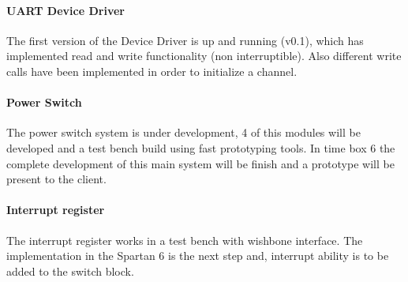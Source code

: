 \paragraph{UART Device Driver}
The first version of the Device Driver is up and running (v0.1), which has implemented read and write functionality (non interruptible). Also different write calls have been implemented in order to initialize a channel.
\paragraph{Power Switch}
The power switch system is under development, 4 of this modules will be developed and a test bench build using fast prototyping tools. In time box 6 the complete development of this main system will be finish and a prototype will be present to the client.
\paragraph{Interrupt register}
The interrupt register works in a test bench with wishbone interface. The implementation in the Spartan 6 is the next step and, interrupt ability is to be added to the switch block.
